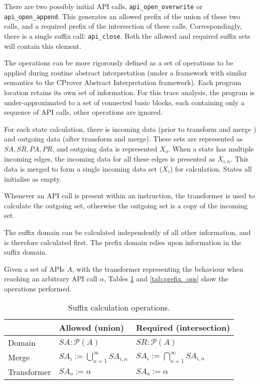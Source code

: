 \documentclass[EPiC]{easychair}
\begin{document}
There are two possibly initial API calls, \texttt{api\_open\_overwrite} or  \texttt{api\_open\_append}.  This generates an allowed prefix of the union of these two calls, and a required prefix of the intersection of these calls.   Correspondingly, there is a single suffix call: \texttt{api\_close}.  Both the allowed and required suffix sets will contain this element.




The operations can be more rigorously defined as a set of operations to be applied during routine abstract interpretation (under a framework with similar semantics to the CProver Abstract Interpretation framework).  Each program location retains its own set of information.  For this trace analysis, the program is under-approximated to a set of connected basic blocks, each containing only a sequence of API calls, other operations are ignored.  

For each state calculation, there is incoming data (prior to transform and merge ) and outgoing data (after transform and merge).  These sets are represented as $SA, SR, PA, PR$, and outgoing data is represented $X_o$.  When a state has multiple incoming edges, the incoming data for all these edges is presented as $X_{i, n}$.  This data is merged to form a single incoming data set ($X_i$) for calculation.  States all initialise as empty.

Whenever an API call is present within an instruction, the transformer is used to calculate the outgoing set, otherwise the outgoing set is a copy of the incoming set.

The suffix domain can be calculated independently of all other information, and is therefore calculated first.  The prefix domain relies upon information in the suffix domain.

Given a set of APIs $A$, with the transformer representing the behaviour when reaching an arbitrary API call $\alpha$, Tables \ref{tab:suffix_ops} and \ref{tab:prefix_ops} show the operations performed.




\begin{table}
	\centering
	\renewcommand{\arraystretch}{1.4}
	\label{tab:suffix_ops}
	\begin{tabular}{|l|l|l|}
		\hline
		& Allowed (union)  &  Required (intersection)\\\hline
		Domain	& $ SA : \mathcal{P}(A)$ &$ SR : \mathcal{P}(A)$ \\
		Merge	& $SA_i := \bigcup_{n=1}^{\infty} SA_{i,n}$ & $SA_i := \bigcap_{n=1}^{\infty} SA_{i,n}$\\
		Transformer	& $SA_o := \alpha$ & $SA_o := \alpha$ \\\hline
		
	\end{tabular}
	\caption{Suffix calculation operations.}
\end{table}
\end{document}
